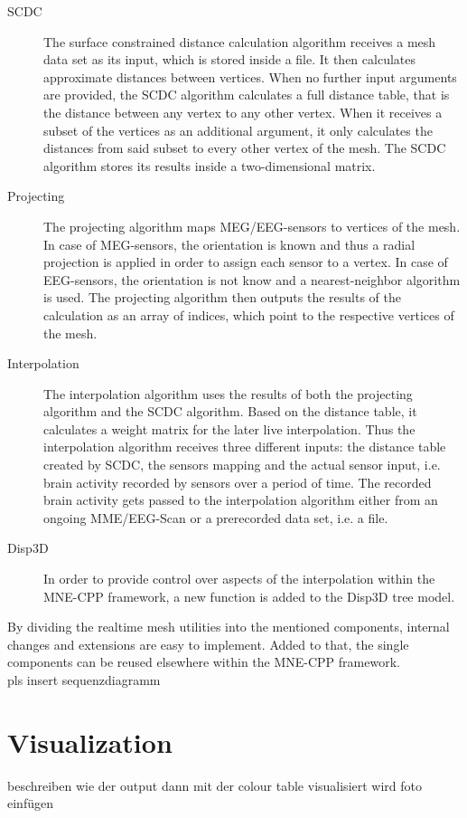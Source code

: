 \documentclass[a4paper, 11pt, ngerman, fleqn]{article}
\begin{document}
\begin{description}
	
	\item[SCDC] 
	The surface constrained distance calculation algorithm receives a mesh data set as its input, which is stored inside a file. It then calculates approximate distances between vertices. When no further input arguments are provided, the SCDC algorithm calculates a full distance table, that is the distance between any vertex to any other vertex.
	When it receives a subset of the vertices as an additional argument, it only calculates the distances from said subset to every other vertex of the mesh. The SCDC algorithm stores its results inside a two-dimensional matrix.
	
	\item[Projecting]
	The projecting algorithm maps MEG/EEG-sensors to vertices of the mesh. In case of MEG-sensors, the orientation is known and thus a radial projection is applied in order to assign each sensor to a vertex. In case of EEG-sensors, the orientation is not know and a nearest-neighbor algorithm is used.
	The projecting algorithm then outputs the results of the calculation as an array of indices, which point to the respective vertices of the mesh.
	
	\item[Interpolation]
	The interpolation algorithm uses the results of both the projecting algorithm and the SCDC algorithm.
	Based on the distance table, it calculates a weight matrix for the later live interpolation. 
	Thus the interpolation algorithm receives three different inputs: the distance table created by SCDC, the sensors mapping and the actual sensor input, i.e. brain activity recorded by sensors over a period of time.
	The recorded brain activity gets passed to the interpolation algorithm either from an ongoing MME/EEG-Scan or a prerecorded data set, i.e. a file. 
	
	\item[Disp3D]
	In order to provide control over aspects of the interpolation within the MNE-CPP framework, a new function is added to the Disp3D tree model.
		
\end{description}

By dividing the realtime mesh utilities into the mentioned components, internal changes and extensions are easy to implement. Added to that, the single components can be reused elsewhere within the MNE-CPP framework.
\\

{pls insert sequenzdiagramm}

\clearpage

\section{Visualization}
beschreiben wie der output dann mit der colour table visualisiert wird
foto einfügen



\clearpage
  
\end{document}
